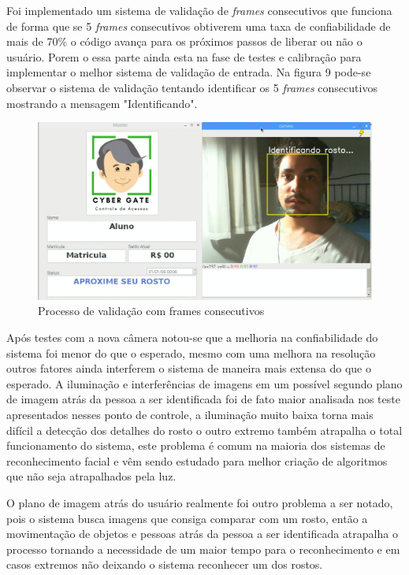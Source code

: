 \documentclass[conference,compsoc]{IEEEtran}
\begin{document}
Foi implementado um sistema de validação de \emph{frames} consecutivos que funciona de forma que se 5 \emph{frames} consecutivos obtiverem uma taxa de confiabilidade de mais de 70\% o código avança para os próximos passos de liberar ou não o usuário. Porem o essa parte ainda esta na fase de testes e calibração para implementar o melhor sistema de validação de entrada. Na figura 9 pode-se observar o sistema de validação tentando identificar os 5 \emph{frames} consecutivos mostrando a mensagem "Identificando". 


\begin{figure}[!ht]
		\centering
		\includegraphics[scale=0.15]{identificando.png}
		\caption{Processo de validação com frames consecutivos}
\end{figure}

	Após testes com a nova câmera notou-se que a melhoria na confiabilidade do sistema foi menor do que o esperado, mesmo com uma melhora na resolução outros fatores ainda interferem o sistema de maneira mais extensa do que o esperado. A iluminação e interferências de imagens em um possível segundo plano de imagem atrás da pessoa a ser identificada foi de fato maior analisada nos teste apresentados nesses ponto de controle, a iluminação muito baixa torna mais difícil a detecção dos detalhes do rosto o outro extremo também atrapalha o total funcionamento do sistema, este problema é comum na maioria dos sistemas de reconhecimento facial e vêm sendo estudado para melhor criação de algoritmos que não seja atrapalhados pela luz. 
	
	O plano de imagem atrás do usuário realmente foi outro problema a ser notado, pois o sistema busca imagens que consiga comparar com um rosto, então a movimentação de objetos e pessoas atrás da pessoa a ser identificada atrapalha o processo tornando a necessidade de um maior tempo para o reconhecimento e em casos extremos não deixando o sistema reconhecer um dos rostos.
	
\end{document}
